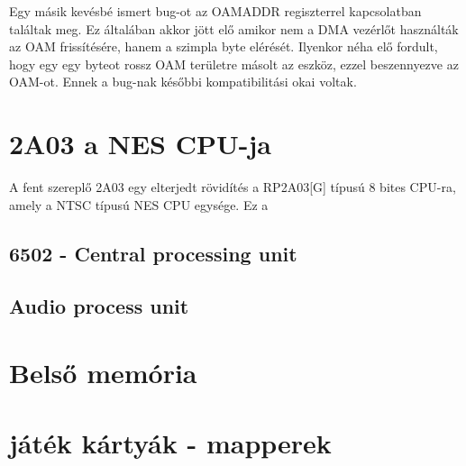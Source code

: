  	 Egy másik kevésbé ismert bug-ot az OAMADDR regiszterrel kapcsolatban találtak meg. Ez általában akkor jött elő amikor nem a DMA vezérlőt használták az OAM frissítésére, hanem a szimpla byte elérését. Ilyenkor néha elő fordult, hogy egy egy byteot rossz OAM területre másolt az eszköz, ezzel beszennyezve az OAM-ot. Ennek a bug-nak későbbi kompatibilitási okai voltak.    
 	 
 	       
\section{2A03 a NES CPU-ja}

A fent szereplő 2A03 egy elterjedt rövidítés a RP2A03[G] típusú 8 bites CPU-ra, amely a NTSC típusú NES CPU egysége. Ez a  

	\subsection{6502 - Central processing unit}

	\subsection{Audio process unit}

\section{Belső memória}

\section{játék kártyák - mapperek}